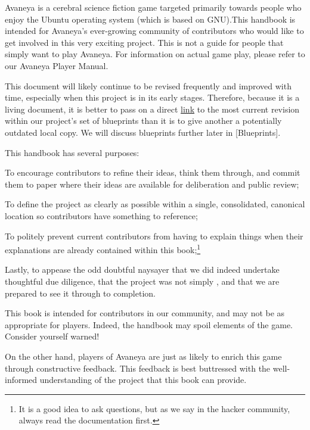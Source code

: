 

Avaneya is a cerebral science fiction game targeted primarily towards people who enjoy the Ubuntu operating system (which is based on GNU). This handbook is intended for Avaneya's ever-growing community of contributors who would like to get involved in this very exciting project. This is not a guide for people that simply want to play Avaneya. For information on actual game play, please refer to our Avaneya Player Manual.

This document will likely continue to be revised frequently and improved with time, especially when this project is in its  early stages. Therefore, because it is a living document, it is better to pass on a direct \href{\LatestHandbookURL}{link} to the most current revision within our project's set of blueprints than it is to give another a potentially outdated local copy. We will discuss blueprints further later in [Blueprints].

This handbook has several purposes:

\startitemize[4]
\item
To encourage contributors to refine their ideas, think them through, and commit them to paper where their ideas are available for deliberation and public review;

\item
To define the project as clearly as possible within a single, consolidated, canonical location so contributors have something to reference;

\item
To politely prevent current contributors from having to explain things when their explanations are already contained within this book;\footnote[rtfm]{It is a good idea to ask questions, but as we say in the hacker community, always read the documentation first.}

\item
Lastly, to appease the odd doubtful naysayer that we did indeed undertake thoughtful due diligence, that the project was not simply , and that we are prepared to see it through to completion.
\stopitemize

This book is intended for contributors in our community, and may not be as appropriate for players. Indeed, the handbook may spoil elements of the game. Consider yourself warned!

On the other hand, players of Avaneya are just as likely to enrich this game through constructive feedback. This feedback is best buttressed with the well-informed understanding of the project that this book can provide.

\StopChapter
